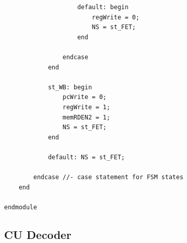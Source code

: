 \documentclass{article}
\begin{document}
\begin{verbatim}
                    default: begin 
                        regWrite = 0;
                        NS = st_FET;
                    end
                    
                endcase
            end
               
            st_WB: begin
                pcWrite = 0;
                regWrite = 1; 
                memRDEN2 = 1;
                NS = st_FET;
            end
 
            default: NS = st_FET;
           
        endcase //- case statement for FSM states
    end
           
endmodule
\end{verbatim}

\pagebreak
\subsection{CU Decoder}
\end{document}
